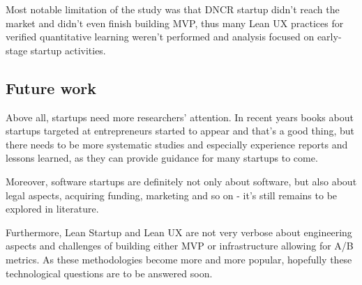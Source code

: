 \documentclass{article}
\begin{document}
Most notable limitation of the study was that DNCR startup didn't reach the market and didn't even finish building MVP, thus many Lean UX practices for verified quantitative learning weren't performed and analysis focused on early-stage startup activities.

\subsection{Future work}
Above all, startups need more researchers' attention. In recent years books about startups targeted at entrepreneurs started to appear and that's a good thing, but there needs to be more systematic studies and especially experience reports and lessons learned, as they can provide guidance for many startups to come.

Moreover, software startups are definitely not only about software, but also about legal aspects, acquiring funding, marketing and so on - it's still remains to be explored in literature.

Furthermore, Lean Startup and Lean UX are not very verbose about engineering aspects and challenges of building either MVP or infrastructure allowing for A/B metrics. As these methodologies become more and more popular, hopefully these technological questions are to be answered soon.

\listoffigures

 
\end{document}
